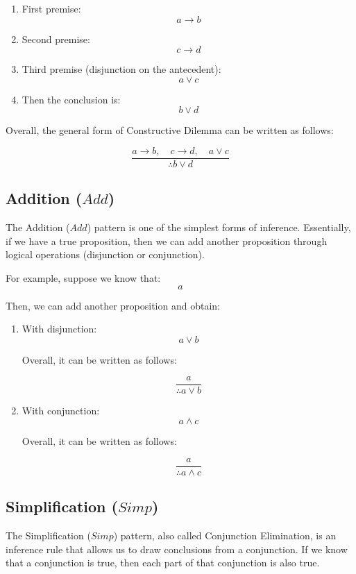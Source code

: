 \documentclass[12pt,a4paper,openany]{article}
\begin{document}
\begin{enumerate}
\item First premise:
  \[a \rightarrow b\]
\item Second premise:
  \[c \rightarrow d\]
\item Third premise (disjunction on the antecedent):
  \[a \lor c\]
\item Then the conclusion is:
  \[b \lor d\]
\end{enumerate}

Overall, the general form of Constructive Dilemma can be written as follows:

\[
\frac{a \rightarrow b, \quad c \rightarrow d, \quad a \lor c}{\therefore b \lor d}
\]

\subsection{Addition (\(Add\))}\label{addition-add}

The Addition (\(Add\)) pattern is one of the simplest forms of inference. Essentially, if we have a true proposition, then we can add another proposition through logical operations (disjunction or conjunction).

For example, suppose we know that:
\[a\]

Then, we can add another proposition and obtain:

\begin{enumerate}
\item With disjunction:
  \[a \lor b\]

  Overall, it can be written as follows:

  \[
   \frac{a}{\therefore a \lor b}
   \]
\item With conjunction:
  \[a \land c\]

  Overall, it can be written as follows:

  \[
   \frac{a}{\therefore a \land c}
   \]
\end{enumerate}

\subsection{Simplification (\(Simp\))}\label{simplification-simp}

The Simplification (\(Simp\)) pattern, also called Conjunction Elimination, is an inference rule that allows us to draw conclusions from a conjunction. If we know that a conjunction is true, then each part of that conjunction is also true.
\end{document}
